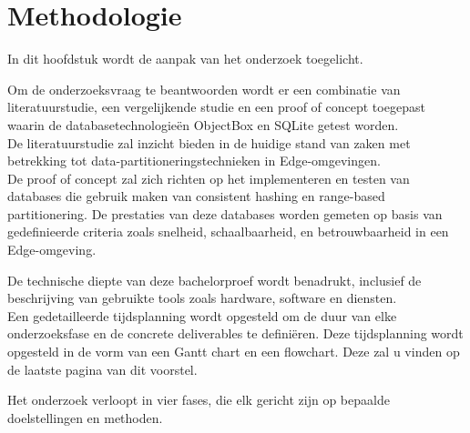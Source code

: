 
\section{Methodologie}%
\label{sec:methodologie}

In dit hoofdstuk wordt de aanpak van het onderzoek toegelicht.

Om de onderzoeksvraag te beantwoorden wordt er een combinatie van literatuurstudie,
 een vergelijkende studie en een proof of concept toegepast waarin de databasetechnologieën ObjectBox en SQLite getest worden. \\

De literatuurstudie zal inzicht bieden in de huidige stand van zaken met betrekking tot data-partitioneringstechnieken in Edge-omgevingen. \\
 
De proof of concept zal zich richten op het implementeren en testen van databases die gebruik maken van consistent hashing en range-based partitionering.
 De prestaties van deze databases worden gemeten op basis van gedefinieerde criteria zoals snelheid, schaalbaarheid, en betrouwbaarheid in een Edge-omgeving.

De technische diepte van deze bachelorproef wordt benadrukt,
 inclusief de beschrijving van gebruikte tools zoals hardware, software en diensten. \\

Een gedetailleerde tijdsplanning wordt opgesteld om de duur van elke onderzoeksfase en de concrete deliverables te definiëren.
Deze tijdsplanning wordt opgesteld in de vorm van een Gantt chart en een flowchart. Deze zal u vinden op de laatste pagina van dit voorstel.

Het onderzoek verloopt in vier fases, die elk gericht zijn op bepaalde doelstellingen en methoden. \\

